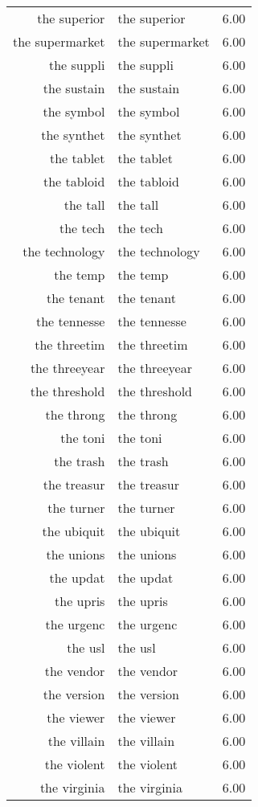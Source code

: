 \begin{table}[ht]
\begin{tabular}{rlr}
  the superior & the superior & 6.00 \\ 
  the supermarket & the supermarket & 6.00 \\ 
  the suppli & the suppli & 6.00 \\ 
  the sustain & the sustain & 6.00 \\ 
  the symbol & the symbol & 6.00 \\ 
  the synthet & the synthet & 6.00 \\ 
  the tablet & the tablet & 6.00 \\ 
  the tabloid & the tabloid & 6.00 \\ 
  the tall & the tall & 6.00 \\ 
  the tech & the tech & 6.00 \\ 
  the technology & the technology & 6.00 \\ 
  the temp & the temp & 6.00 \\ 
  the tenant & the tenant & 6.00 \\ 
  the tennesse & the tennesse & 6.00 \\ 
  the threetim & the threetim & 6.00 \\ 
  the threeyear & the threeyear & 6.00 \\ 
  the threshold & the threshold & 6.00 \\ 
  the throng & the throng & 6.00 \\ 
  the toni & the toni & 6.00 \\ 
  the trash & the trash & 6.00 \\ 
  the treasur & the treasur & 6.00 \\ 
  the turner & the turner & 6.00 \\ 
  the ubiquit & the ubiquit & 6.00 \\ 
  the unions & the unions & 6.00 \\ 
  the updat & the updat & 6.00 \\ 
  the upris & the upris & 6.00 \\ 
  the urgenc & the urgenc & 6.00 \\ 
  the usl & the usl & 6.00 \\ 
  the vendor & the vendor & 6.00 \\ 
  the version & the version & 6.00 \\ 
  the viewer & the viewer & 6.00 \\ 
  the villain & the villain & 6.00 \\ 
  the violent & the violent & 6.00 \\ 
  the virginia & the virginia & 6.00 \\ 

\end{tabular}
\end{table}
